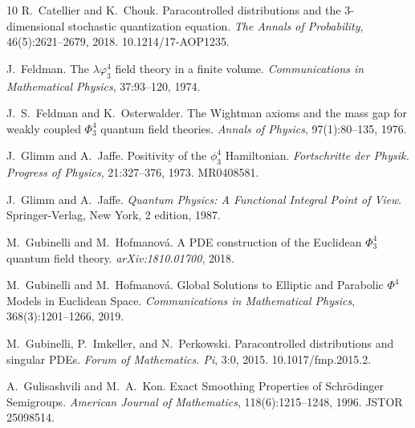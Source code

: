\documentclass[11pt]{article}
\newcommand{\tmtextit}[1]{{\itshape{#1}}}
\begin{document}
\begin{thebibliography}{10}
  R.~Catellier  and  K.~Chouk.
  {\newblock}Paracontrolled distributions and the 3-dimensional stochastic
  quantization equation. {\newblock}\tmtextit{The Annals of Probability},
  46(5):2621--2679, 2018.
  {\newblock}\href{Https://doi.org/10.1214/17-AOP1235}{}10.1214/17-AOP1235.{\newblock}
  
  J.~Feldman. {\newblock}The $\lambda
  \varphi^4_3$ field theory in a finite volume.
  {\newblock}\tmtextit{Communications in Mathematical Physics}, 37:93--120,
  1974.{\newblock}
  
  J.~S.~Feldman  and  K.~Osterwalder.
  {\newblock}The Wightman axioms and the mass gap for weakly coupled
  $\Phi^4_3$ quantum field theories. {\newblock}\tmtextit{Annals of Physics},
  97(1):80--135, 1976.{\newblock}
  
  J.~Glimm  and  A.~Jaffe.
  {\newblock}Positivity of the $\phi^4_3$ Hamiltonian.
  {\newblock}\tmtextit{Fortschritte der Physik. Progress of Physics},
  21:327--376, 1973.
  {\newblock}\href{Https://mathscinet.ams.org/mathscinet-getitem?mr=0408581}{}MR0408581.{\newblock}
  
  J.~Glimm  and  A.~Jaffe.
  {\newblock}\tmtextit{Quantum Physics: A Functional Integral Point of View}.
  {\newblock}Springer-Verlag, New York, 2  edition, 1987.{\newblock}
  
  M.~Gubinelli  and  M.~Hofmanov{\'a}.
  {\newblock}A PDE construction of the Euclidean $\Phi^4_3$ quantum field
  theory.
  {\newblock}\tmtextit{\href{Http://arxiv.org/abs/1810.01700}{}arXiv:1810.01700},
  2018.{\newblock}
  
  M.~Gubinelli  and  M.~Hofmanov{\'a}.
  {\newblock}Global Solutions to Elliptic and Parabolic $\Phi^4$ Models in
  Euclidean Space. {\newblock}\tmtextit{Communications in Mathematical
  Physics}, 368(3):1201--1266, 2019.{\newblock}
  
  M.~Gubinelli, P.~Imkeller, and 
  N.~Perkowski. {\newblock}Paracontrolled distributions and singular PDEs.
  {\newblock}\tmtextit{Forum of Mathematics. Pi}, 3:0, 2015.
  {\newblock}\href{Https://doi.org/10.1017/fmp.2015.2}{}10.1017/fmp.2015.2.{\newblock}
  
  A.~Gulisashvili  and  M.~A.~Kon.
  {\newblock}Exact Smoothing Properties of Schr{\"o}dinger Semigroups.
  {\newblock}\tmtextit{American Journal of Mathematics}, 118(6):1215--1248,
  1996. {\newblock}\href{Http://www.jstor.org/stable/25098514}{}JSTOR
  25098514.{\newblock}
  

\end{thebibliography}
\end{document}
